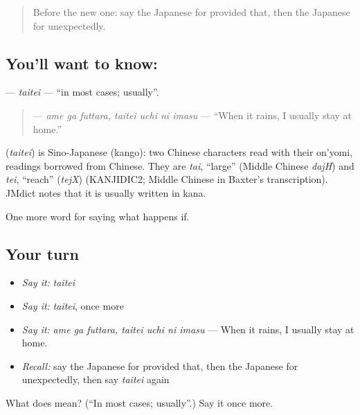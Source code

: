 \begin{quote}
Before the new one: say the Japanese for provided that, then the Japanese for unexpectedly.
\end{quote}

\subsection*{You'll want to know: }
\textbf{} — \emph{taitei} — \textquotedblleft{}in most cases; usually\textquotedblright{}.

\begin{quote}
\textbf{   } — \emph{ame ga futtara, taitei uchi ni imasu} — \textquotedblleft{}When it rains, I usually stay at home.\textquotedblright{}
\end{quote}

\begin{cousinweb}
\textbf{} (\emph{taitei}) is Sino-Japanese (kango): two Chinese characters read with their on'yomi, readings borrowed from Chinese. They are \emph{tai}, \textquotedblleft{}large\textquotedblright{} (Middle Chinese \emph{dajH}) and \emph{tei}, \textquotedblleft{}reach\textquotedblright{} (\emph{tejX}) (KANJIDIC2; Middle Chinese in Baxter's transcription). JMdict notes that it is usually written in kana.
\end{cousinweb}

\begin{grammarlens}[title={What you've built}]
One more word for saying what happens if.
\end{grammarlens}

\subsection*{Your turn}
\begin{itemize}
\raggedright
  \item \emph{Say it:} \emph{taitei}
  \item \emph{Say it:} \emph{taitei}, once more
  \item \emph{Say it:} \emph{ame ga futtara, taitei uchi ni imasu} — When it rains, I usually stay at home.
  \item \emph{Recall:} say the Japanese for provided that, then the Japanese for unexpectedly, then say \emph{taitei} again
\end{itemize}

\begin{tcolorbox}[breakable,colback=teal!4,colframe=teal!35!black,title={Before you move on}]
What does  mean? (\textquotedblleft{}In most cases; usually\textquotedblright{}.) Say it once more.
\end{tcolorbox}

